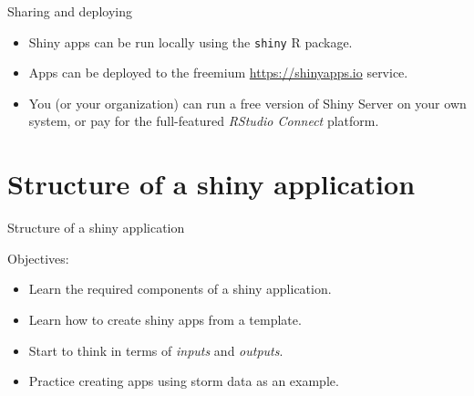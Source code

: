\documentclass[
  12pt,
  ignorenonframetext,
]{beamer}
\providecommand{\tightlist}{%
  \setlength{\itemsep}{0pt}\setlength{\parskip}{0pt}}
\begin{document}
\begin{frame}[fragile]{Sharing and deploying}
\protect\hypertarget{sharing-and-deploying}{}

\begin{itemize}[<+->]
\tightlist
\item
  Shiny apps can be run locally using the \texttt{shiny} R package.

  \begin{center}
  \end{center}
\end{itemize}

\begin{itemize}[<+->]
\tightlist
\item
  Apps can be deployed to the freemium \url{https://shinyapps.io}
  service.

  \begin{center}
  \end{center}
\end{itemize}

\begin{itemize}[<+->]
\tightlist
\item
  You (or your organization) can run a free version of Shiny Server on
  your own system, or pay for the full-featured \emph{RStudio Connect}
  platform.
\end{itemize}

\end{frame}

\hypertarget{structure-of-a-shiny-application}{%
\section{Structure of a shiny
application}\label{structure-of-a-shiny-application}}

\begin{frame}{Structure of a shiny application}

Objectives:

\begin{itemize}
\item
  Learn the required components of a shiny application.
\item
  Learn how to create shiny apps from a template.
\item
  Start to think in terms of \emph{inputs} and \emph{outputs}.
\item
  Practice creating apps using storm data as an example.
\end{itemize}

\end{frame}
\end{document}
